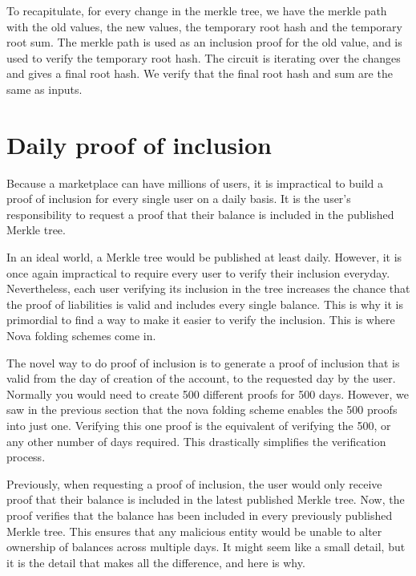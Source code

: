 To recapitulate, for every change in the merkle tree, we have the merkle path with the old values, the new values, the temporary root hash and
the temporary root sum.
The merkle path is used as an inclusion proof for the old value, and is used to verify the temporary root hash.
The circuit is iterating over the changes and gives a final root hash. We verify that the final root hash and sum are the same as inputs.








\section{Daily proof of inclusion}


Because a marketplace can have millions of users, it is impractical to build a proof of inclusion for every single user on a daily basis.
It is the user's responsibility to request a proof that their balance is included in the published Merkle tree.


In an ideal world, a Merkle tree would be published at least daily. However, it is once again impractical to require every user to verify their inclusion everyday.
Nevertheless, each user verifying its inclusion in the tree increases the chance that the proof of liabilities is valid and includes every single balance.
This is why it is primordial to find a way to make it easier to verify the inclusion. This is where Nova folding schemes come in.


The novel way to do proof of inclusion is to generate a proof of inclusion that is valid from the day of creation of the account, to the requested day by the user.
Normally you would need to create 500 different proofs for 500 days. However, we saw in the previous section that the nova folding scheme enables the 500 proofs into just one.
Verifying this one proof is the equivalent of verifying the 500, or any other number of days required.
This drastically simplifies the verification process.


Previously, when requesting a proof of inclusion, the user would only receive proof that their balance is included in the latest published Merkle tree. Now, the proof verifies that the balance has been included in every previously published Merkle tree.
This ensures that any malicious entity would be unable to alter ownership of balances across multiple days. It might seem like a small detail, but it is the detail that makes all the difference, and here is why.


